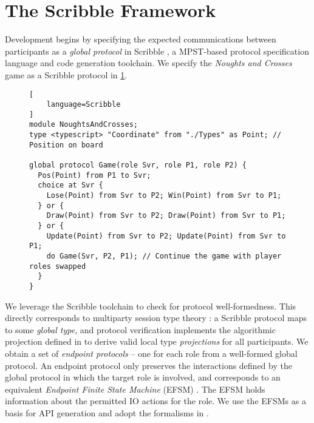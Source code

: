 \section{The Scribble Framework}
\label{section:scribble}

Development begins by specifying the expected communications between
participants as a \textit{global protocol} in Scribble \cite{Scribble}, a
MPST-based protocol specification language and code generation toolchain.
We specify the \textit{Noughts and Crosses} game as a Scribble protocol in
\cref{lst:game}.

\begin{figure}[!h]
\begin{lstlisting}[
	language=Scribble
]
module NoughtsAndCrosses;
type <typescript> "Coordinate" from "./Types" as Point;	// Position on board

global protocol Game(role Svr, role P1, role P2) {
  Pos(Point) from P1 to Svr;
  choice at Svr {
    Lose(Point) from Svr to P2; Win(Point) from Svr to P1;
  } or {
    Draw(Point) from Svr to P2; Draw(Point) from Svr to P1;
  } or {
    Update(Point) from Svr to P2; Update(Point) from Svr to P1;
    do Game(Svr, P2, P1); // Continue the game with player roles swapped
  }
}
\end{lstlisting}
\label{lst:game}
\end{figure}

We leverage the Scribble toolchain to check for protocol
well-formedness.
This directly corresponds to multiparty session
type theory \cite{FeatherweightScribble}:
a Scribble protocol maps to some \textit{global type}, and protocol
verification implements the algorithmic projection defined in \cite{MPST} to
derive valid local type \textit{projections} for all participants.
We obtain a set of \textit{endpoint protocols} -- one for each role from a
well-formed global protocol.
An endpoint protocol only preserves the interactions defined by the global
protocol in which the target role is involved, and corresponds to an equivalent
\textit{Endpoint Finite State Machine} (EFSM) \cite{ICALP13CFSM}.
The EFSM holds information about the permitted IO actions for the role.
We use the EFSMs as a basis for API generation and adopt the formalisms in
\cite{Hybrid2016}.


